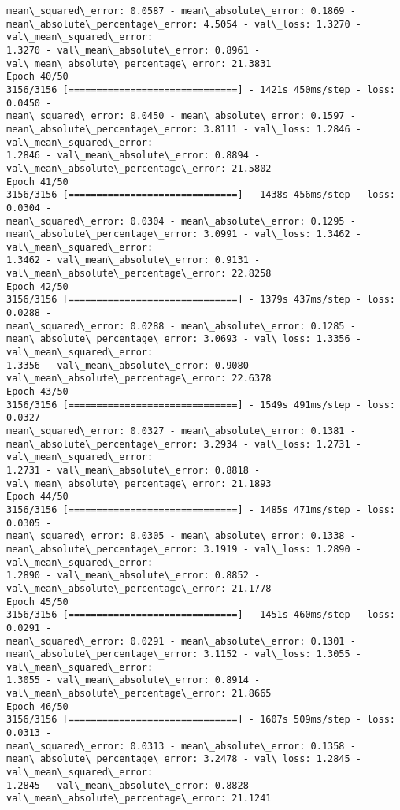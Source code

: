 \documentclass[11pt]{article}
\begin{document}
\begin{Verbatim}[commandchars=\\\{\},fontsize=\footnotesize]
mean\_squared\_error: 0.0587 - mean\_absolute\_error: 0.1869 -
mean\_absolute\_percentage\_error: 4.5054 - val\_loss: 1.3270 - val\_mean\_squared\_error:
1.3270 - val\_mean\_absolute\_error: 0.8961 - val\_mean\_absolute\_percentage\_error: 21.3831
Epoch 40/50
3156/3156 [==============================] - 1421s 450ms/step - loss: 0.0450 -
mean\_squared\_error: 0.0450 - mean\_absolute\_error: 0.1597 -
mean\_absolute\_percentage\_error: 3.8111 - val\_loss: 1.2846 - val\_mean\_squared\_error:
1.2846 - val\_mean\_absolute\_error: 0.8894 - val\_mean\_absolute\_percentage\_error: 21.5802
Epoch 41/50
3156/3156 [==============================] - 1438s 456ms/step - loss: 0.0304 -
mean\_squared\_error: 0.0304 - mean\_absolute\_error: 0.1295 -
mean\_absolute\_percentage\_error: 3.0991 - val\_loss: 1.3462 - val\_mean\_squared\_error:
1.3462 - val\_mean\_absolute\_error: 0.9131 - val\_mean\_absolute\_percentage\_error: 22.8258
Epoch 42/50
3156/3156 [==============================] - 1379s 437ms/step - loss: 0.0288 -
mean\_squared\_error: 0.0288 - mean\_absolute\_error: 0.1285 -
mean\_absolute\_percentage\_error: 3.0693 - val\_loss: 1.3356 - val\_mean\_squared\_error:
1.3356 - val\_mean\_absolute\_error: 0.9080 - val\_mean\_absolute\_percentage\_error: 22.6378
Epoch 43/50
3156/3156 [==============================] - 1549s 491ms/step - loss: 0.0327 -
mean\_squared\_error: 0.0327 - mean\_absolute\_error: 0.1381 -
mean\_absolute\_percentage\_error: 3.2934 - val\_loss: 1.2731 - val\_mean\_squared\_error:
1.2731 - val\_mean\_absolute\_error: 0.8818 - val\_mean\_absolute\_percentage\_error: 21.1893
Epoch 44/50
3156/3156 [==============================] - 1485s 471ms/step - loss: 0.0305 -
mean\_squared\_error: 0.0305 - mean\_absolute\_error: 0.1338 -
mean\_absolute\_percentage\_error: 3.1919 - val\_loss: 1.2890 - val\_mean\_squared\_error:
1.2890 - val\_mean\_absolute\_error: 0.8852 - val\_mean\_absolute\_percentage\_error: 21.1778
Epoch 45/50
3156/3156 [==============================] - 1451s 460ms/step - loss: 0.0291 -
mean\_squared\_error: 0.0291 - mean\_absolute\_error: 0.1301 -
mean\_absolute\_percentage\_error: 3.1152 - val\_loss: 1.3055 - val\_mean\_squared\_error:
1.3055 - val\_mean\_absolute\_error: 0.8914 - val\_mean\_absolute\_percentage\_error: 21.8665
Epoch 46/50
3156/3156 [==============================] - 1607s 509ms/step - loss: 0.0313 -
mean\_squared\_error: 0.0313 - mean\_absolute\_error: 0.1358 -
mean\_absolute\_percentage\_error: 3.2478 - val\_loss: 1.2845 - val\_mean\_squared\_error:
1.2845 - val\_mean\_absolute\_error: 0.8828 - val\_mean\_absolute\_percentage\_error: 21.1241

\end{Verbatim}
\end{document}
